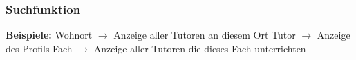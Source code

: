  \begin{frame}
   \frametitle{Suchfunktion}
    \textbf{Beispiele:} \newline
   Wohnort $\rightarrow$ Anzeige aller Tutoren an diesem Ort \newline
    Tutor $\rightarrow$ Anzeige des Profils \newline
    Fach $\rightarrow$ Anzeige aller Tutoren die dieses Fach unterrichten \newline
 \end{frame}
 